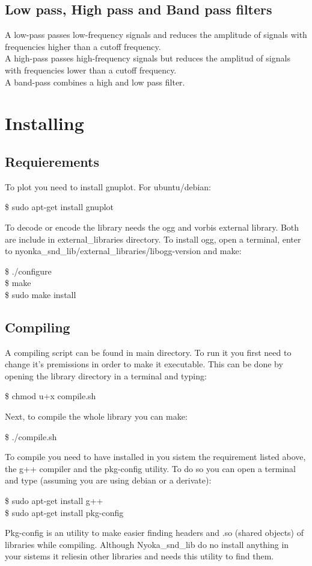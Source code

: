 \documentclass[letterpaper]{article}
\begin{document}
\subsection{Low pass, High pass and Band pass filters}
A low-pass passes low-frequency signals and reduces the amplitude of signals with frequencies higher than a cutoff frequency.\\
A high-pass passes high-frequency signals but reduces the amplitud of signals with frequencies lower than a cutoff frequency.\\
A band-pass combines a high and low pass filter. 

\section{Installing}
\subsection{Requierements}
To plot you need to install gnuplot. For ubuntu/debian:
\begin{center}
\$ sudo apt-get install gnuplot\\
\end{center}
To decode or encode the library needs the ogg and vorbis external library. Both are include in external\_libraries directory. To install ogg, open a terminal, enter to nyonka\_snd\_lib/external\_libraries/libogg-version and make:
\begin{center}
	\$ ./configure\\
	\$ make\\
	\$ sudo make install
\end{center}
\subsection{Compiling}
A compiling script can be found in main directory. To run it you first need to change it's premissions in order to make it executable. This can be done by opening the library directory in a terminal and typing:
\begin{center}
	\$ chmod u+x compile.sh
\end{center}
Next, to compile the whole library you can make:
\begin{center}
	\$ ./compile.sh
\end{center}
To compile you need to have installed in you sistem the requirement listed above, the g++ compiler and the pkg-config utility. To do so you can open a terminal and type (assuming you are using debian or a derivate):
\begin{center}
	\$ sudo apt-get install g++\\
	\$ sudo apt-get install pkg-config	
\end{center}	
Pkg-config is an utility to make easier finding headers and .so (shared objects) of libraries while compiling. Although Nyoka\_snd\_lib do no install anything in your sistems it reliesin other libraries and needs this utility to find them. 
\end{document}
